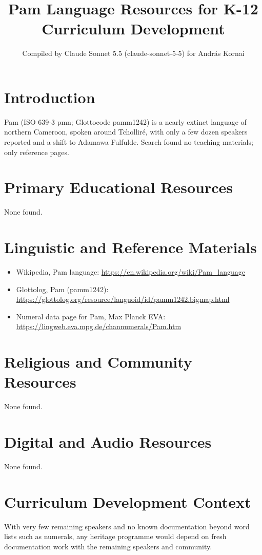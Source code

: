 \documentclass[12pt]{article}
\title{Pam Language Resources for K-12 Curriculum Development}
\author{Compiled by Claude Sonnet 5.5 (claude-sonnet-5-5) for Andr\'as Kornai}
\date{}
\begin{document}
\maketitle

\section{Introduction}
Pam (ISO 639-3 pmn; Glottocode pamm1242) is a nearly extinct language of northern Cameroon, spoken around Tcholliré, with only a few dozen speakers reported and a shift to Adamawa Fulfulde. Search found no teaching materials; only reference pages.

\section{Primary Educational Resources}
None found.

\section{Linguistic and Reference Materials}
\begin{itemize}
\item Wikipedia, Pam language: \url{https://en.wikipedia.org/wiki/Pam_language}
\item Glottolog, Pam (pamm1242): \url{https://glottolog.org/resource/languoid/id/pamm1242.bigmap.html}
\item Numeral data page for Pam, Max Planck EVA: \url{https://lingweb.eva.mpg.de/channumerals/Pam.htm}
\end{itemize}

\section{Religious and Community Resources}
None found.

\section{Digital and Audio Resources}
None found.

\section{Curriculum Development Context}
With very few remaining speakers and no known documentation beyond word lists such as numerals, any heritage programme would depend on fresh documentation work with the remaining speakers and community.
\end{document}
